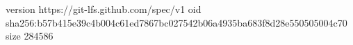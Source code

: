 version https://git-lfs.github.com/spec/v1
oid sha256:b57b415e39c4b004c61ed7867bc027542b06a4935ba683f8d28e550505004c70
size 284586
